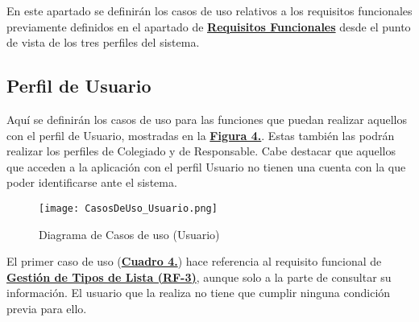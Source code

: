 En este apartado se definirán los casos de uso relativos a los requisitos funcionales previamente definidos en el apartado de \textbf{\hyperref[lrf]{Requisitos Funcionales}} desde el punto de vista de los tres perfiles del sistema.


\subsection{Perfil de Usuario}


\addtocounter{figura_cap4}{1}
Aquí se definirán los casos de uso para las funciones que puedan realizar aquellos con el perfil de Usuario, mostradas en la \textbf{\hyperref[fig:CasosDeUso_Usuario]{Figura 4.}}. Estas también las podrán realizar los perfiles de Colegiado y de Responsable. Cabe destacar que aquellos que acceden a la aplicación con el perfil Usuario no tienen una cuenta con la que poder identificarse ante el sistema.

\begin{figure}[!htbp]
  \centering
  \texttt{[image: CasosDeUso\_Usuario.png]}
  \caption{Diagrama de Casos de uso (Usuario)}
  \label{fig:CasosDeUso_Usuario}
\end{figure}
\FloatBarrier
 \pagebreak

\addtocounter{tabla}{1}
El primer caso de uso (\textbf{\hyperref[tab:cuuConsultaTiposLst]{Cuadro 4.}}) hace referencia al requisito funcional de \textbf{\hyperref[tab:rfGestTipoLst]{Gestión de Tipos de Lista (RF-3)}}, aunque solo a la parte de consultar su información. El usuario que la realiza no tiene que cumplir ninguna condición previa para ello.

